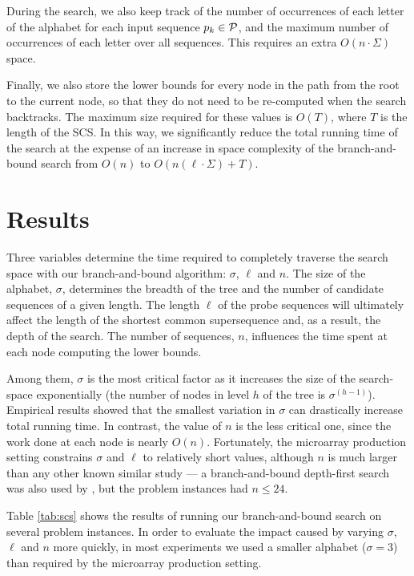 During the search, we also keep track of the number of occurrences of each
letter of the alphabet for each input sequence $p_k \in {\mathcal{P}}$, and the maximum
number of occurrences of each letter over all sequences. This requires
an extra $O(n \cdot \Sigma)$ space.

Finally, we also store the lower bounds for every node in the path from the root
to the current node, so that they do not need to be re-computed when the search
backtracks. The maximum size required for these values is $O(T)$, where $T$ is
the length of the SCS. In this way, we significantly reduce the total running
time of the search at the expense of an increase in space complexity of the
branch-and-bound search from $O(n)$ to $O(n(\ell \cdot \Sigma) + T)$.

\section{Results}
\label{sec:scs_results}

Three variables determine the time required to completely traverse the search
space with our branch-and-bound algorithm: $\sigma$, $\ell$ and $n$. The size of
the alphabet, $\sigma$, determines the breadth of the tree and the number of
candidate sequences of a given length. The length $\ell$ of the probe
sequences will ultimately affect the length of the shortest common supersequence
and, as a result, the depth of the search. The number of sequences, $n$,
influences the time spent at each node computing the lower bounds.

Among them, $\sigma$ is the most critical factor as it increases the size of the
search-space exponentially (the number of nodes in level $h$ of the tree is
$\sigma^{(h - 1)}$). Empirical results showed that the smallest variation in
$\sigma$ can drastically increase total running time. In contrast, the value of
$n$ is the less critical one, since the work done at each node is nearly $O(n)$.
Fortunately, the microarray production setting constrains $\sigma$ and $\ell$
to relatively short values, although $n$ is much larger than any other known
similar study --- a branch-and-bound depth-first search was also used by
\citet{Fraser1995}, but the problem instances had $n \leq 24$.

Table \ref{tab:scs} shows the results of running our branch-and-bound search on
several problem instances. In order to evaluate the impact caused by varying
$\sigma$, $\ell$ and $n$ more quickly, in most experiments we used a smaller
alphabet ($\sigma = 3$) than required by the microarray production setting.

